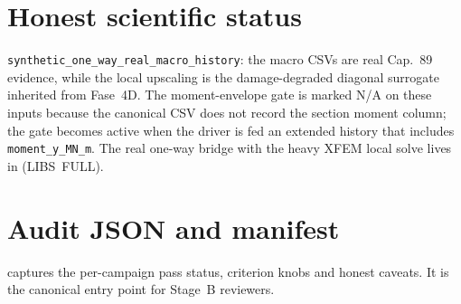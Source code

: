 \section{Honest scientific status}

\texttt{synthetic\_one\_way\_real\_macro\_history}: the macro CSVs are
real Cap.~89 evidence, while the local upscaling is the damage-degraded
diagonal surrogate inherited from Fase~4D. The moment-envelope gate is
marked N/A on these inputs because the canonical CSV does not record
the section moment column; the gate becomes active when the driver is
fed an extended history that includes \texttt{moment\_y\_MN\_m}. The
real one-way bridge with the heavy XFEM local solve lives in
 (LIBS~FULL).

\section{Audit JSON and manifest}

captures the per-campaign pass status, criterion knobs and honest
caveats. It is the canonical entry point for Stage~B reviewers.

